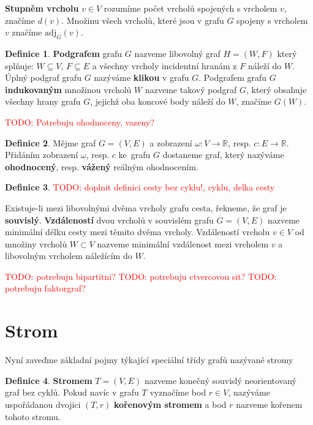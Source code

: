 \documentclass[11pt,american,czech,oneside]{book}
\theoremstyle{plain}
\theoremstyle{definition}
\newtheorem{definition}{Definice}
\newcommand{\TODO}[1]{\textcolor{red}{TODO: #1}}
\begin{document}
\textbf{Stupněm vrcholu} $v \in V$ rozumíme počet vrcholů spojených s vrcholem $v$, značíme $d(v)$. Množinu všech vrcholů, které jsou v grafu $G$ spojeny s vrcholem $v$ značíme $\mathrm{adj}_G(v)$.

\begin{definition}
  \textbf{Podgrafem} grafu $G$ nazveme libovolný graf $H=(W,F)$ který splňuje: $W\subseteq V$, $F\subseteq E$ a všechny vrcholy incidentní hranám z $F$ náleží do $W$. Úplný podgraf grafu $G$ nazýváme \textbf{klikou} v grafu $G$. Podgrafem grafu $G$ \textbf{indukovaným} množinou vrcholů $W$ nazveme takový podgraf $G$, který obsahuje všechny hrany grafu $G$, jejichž oba koncové body náleží do $W$, značíme $G(W)$.
\end{definition}


\TODO{Potrebuju ohodnoceny, vazeny?}
\begin{definition}
  Mějme graf $G=(V,E)$ a zobrazení $\omega:V \rightarrow \mathbb{R}$, resp. $c: E \rightarrow \mathbb{R}$. Přidáním zobrazení $\omega$, resp. $c$ ke~grafu $G$ dostaneme graf, který nazýváme \textbf{ohodnocený}, resp. \textbf{vážený} reálným ohodnocením.
\end{definition}

\begin{definition}
  \TODO{doplnit definici cesty bez cyklu!, cyklu, delka cesty}
\end{definition}

Existuje-li mezi libovolnými dvěma vrcholy grafu cesta, řekneme, že graf je \textbf{souvislý}.
\textbf{Vzdáleností} dvou vrcholů v souvislém grafu $G=(V,E)$ nazveme minimální délku cesty mezi těmito dvěma vrcholy. Vzdáleností vrcholu $v \in V$ od množiny vrcholů $W \subset V$ nazveme minimální vzdálenost mezi vrcholem $v$ a libovolným vrcholem náležícím do $W$. 

\TODO{potrebuju bipartitni?}
\TODO{potrebuju ctvercovou sit?}
\TODO{potrebuju faktorgraf?}

\section{Strom}

Nyní zaveďme základní pojmy týkající speciální třídy grafů nazývané stromy \cite{koub:11}

\begin{definition}
  \textbf{Stromem} $T=(V,E)$ nazveme konečný souvislý neorientovaný graf bez cyklů. Pokud navíc v grafu $T$ vyznačíme bod $r \in V$, nazýváme uspořádanou dvojici $(T,r)$ \textbf{kořenovým stromem} a bod $r$ nazveme kořenem tohoto stromu.
\end{definition}
\end{document}
